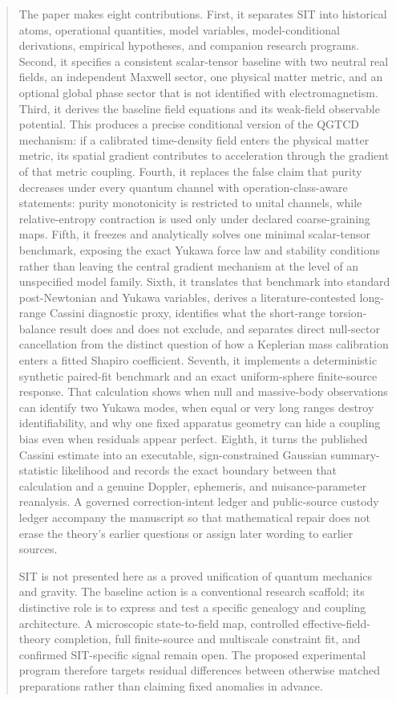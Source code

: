 \documentclass[
  american,
  11pt,
  letterpaper,
]{article}
\begin{document}
\begin{abstract}
The paper makes eight contributions. First, it separates SIT into historical atoms, operational quantities, model variables, model-conditional derivations, empirical hypotheses, and companion research programs. Second, it specifies a consistent scalar-tensor baseline with two neutral real fields, an independent Maxwell sector, one physical matter metric, and an optional global phase sector that is not identified with electromagnetism. Third, it derives the baseline field equations and its weak-field observable potential. This produces a precise conditional version of the QGTCD mechanism: if a calibrated time-density field enters the physical matter metric, its spatial gradient contributes to acceleration through the gradient of that metric coupling. Fourth, it replaces the false claim that purity decreases under every quantum channel with operation-class-aware statements: purity monotonicity is restricted to unital channels, while relative-entropy contraction is used only under declared coarse-graining maps. Fifth, it freezes and analytically solves one minimal scalar-tensor benchmark, exposing the exact Yukawa force law and stability conditions rather than leaving the central gradient mechanism at the level of an unspecified model family. Sixth, it translates that benchmark into standard post-Newtonian and Yukawa variables, derives a literature-contested long-range Cassini diagnostic proxy, identifies what the short-range torsion-balance result does and does not exclude, and separates direct null-sector cancellation from the distinct question of how a Keplerian mass calibration enters a fitted Shapiro coefficient. Seventh, it implements a deterministic synthetic paired-fit benchmark and an exact uniform-sphere finite-source response. That calculation shows when null and massive-body observations can identify two Yukawa modes, when equal or very long ranges destroy identifiability, and why one fixed apparatus geometry can hide a coupling bias even when residuals appear perfect. Eighth, it turns the published Cassini estimate into an executable, sign-constrained Gaussian summary-statistic likelihood and records the exact boundary between that calculation and a genuine Doppler, ephemeris, and nuisance-parameter reanalysis. A governed correction-intent ledger and public-source custody ledger accompany the manuscript so that mathematical repair does not erase the theory's earlier questions or assign later wording to earlier sources.

SIT is not presented here as a proved unification of quantum mechanics and gravity. The baseline action is a conventional research scaffold; its distinctive role is to express and test a specific genealogy and coupling architecture. A microscopic state-to-field map, controlled effective-field-theory completion, full finite-source and multiscale constraint fit, and confirmed SIT-specific signal remain open. The proposed experimental program therefore targets residual differences between otherwise matched preparations rather than claiming fixed anomalies in advance.

\end{abstract}
\end{document}
